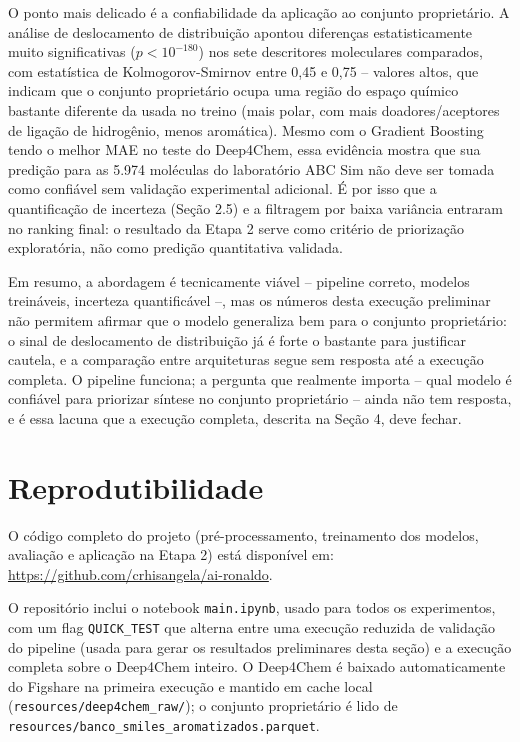 \documentclass[12pt]{article}
\begin{document}
O ponto mais delicado é a confiabilidade da aplicação ao conjunto proprietário. A análise de deslocamento de distribuição apontou diferenças estatisticamente muito significativas ($p < 10^{-180}$) nos sete descritores moleculares comparados, com estatística de Kolmogorov-Smirnov entre 0,45 e 0,75 -- valores altos, que indicam que o conjunto proprietário ocupa uma região do espaço químico bastante diferente da usada no treino (mais polar, com mais doadores/aceptores de ligação de hidrogênio, menos aromática). Mesmo com o Gradient Boosting tendo o melhor MAE no teste do Deep4Chem, essa evidência mostra que sua predição para as 5.974 moléculas do laboratório ABC Sim não deve ser tomada como confiável sem validação experimental adicional. É por isso que a quantificação de incerteza (Seção 2.5) e a filtragem por baixa variância entraram no ranking final: o resultado da Etapa 2 serve como critério de priorização exploratória, não como predição quantitativa validada.

Em resumo, a abordagem é tecnicamente viável -- pipeline correto, modelos treináveis, incerteza quantificável --, mas os números desta execução preliminar não permitem afirmar que o modelo generaliza bem para o conjunto proprietário: o sinal de deslocamento de distribuição já é forte o bastante para justificar cautela, e a comparação entre arquiteturas segue sem resposta até a execução completa. O pipeline funciona; a pergunta que realmente importa -- qual modelo é confiável para priorizar síntese no conjunto proprietário -- ainda não tem resposta, e é essa lacuna que a execução completa, descrita na Seção 4, deve fechar.

\section{Reprodutibilidade}

O código completo do projeto (pré-processamento, treinamento dos modelos, avaliação e aplicação na Etapa 2) está disponível em: \url{https://github.com/crhisangela/ai-ronaldo}.

O repositório inclui o notebook \texttt{main.ipynb}, usado para todos os experimentos, com um flag \texttt{QUICK\_TEST} que alterna entre uma execução reduzida de validação do pipeline (usada para gerar os resultados preliminares desta seção) e a execução completa sobre o Deep4Chem inteiro. O Deep4Chem é baixado automaticamente do Figshare na primeira execução e mantido em cache local (\texttt{resources/deep4chem\_raw/}); o conjunto proprietário é lido de \texttt{resources/banco\_smiles\_aromatizados.parquet}.
\end{document}
